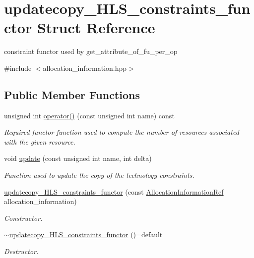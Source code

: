 \hypertarget{structupdatecopy__HLS__constraints__functor}{}\section{updatecopy\+\_\+\+H\+L\+S\+\_\+constraints\+\_\+functor Struct Reference}
\label{structupdatecopy__HLS__constraints__functor}


constraint functor used by get\+\_\+attribute\+\_\+of\+\_\+fu\+\_\+per\+\_\+op  




{\ttfamily \#include $<$allocation\+\_\+information.\+hpp$>$}

\subsection*{Public Member Functions}
\begin{DoxyCompactItemize}
\item 
unsigned int \hyperlink{structupdatecopy__HLS__constraints__functor_a0c91cf04b2cd90bc3b4eb6c39ac27428}{operator()} (const unsigned int name) const
\begin{DoxyCompactList}\small\item\em Required functor function used to compute the number of resources associated with the given resource. \end{DoxyCompactList}\item 
void \hyperlink{structupdatecopy__HLS__constraints__functor_a4d926dfe5bd3421102d4637577b47956}{update} (const unsigned int name, int delta)
\begin{DoxyCompactList}\small\item\em Function used to update the copy of the technology constraints. \end{DoxyCompactList}\item 
\hyperlink{structupdatecopy__HLS__constraints__functor_af834a00a3cbfe83e71a128ba425f0a93}{updatecopy\+\_\+\+H\+L\+S\+\_\+constraints\+\_\+functor} (const \hyperlink{allocation__information_8hpp_ad90a86da153cba50cbcefc4679036755}{Allocation\+Information\+Ref} allocation\+\_\+information)
\begin{DoxyCompactList}\small\item\em Constructor. \end{DoxyCompactList}\item 
\hyperlink{structupdatecopy__HLS__constraints__functor_a17b399c96348a2b6a3f3a8aca2cb3f66}{$\sim$updatecopy\+\_\+\+H\+L\+S\+\_\+constraints\+\_\+functor} ()=default
\begin{DoxyCompactList}\small\item\em Destructor. \end{DoxyCompactList}\end{DoxyCompactItemize}
